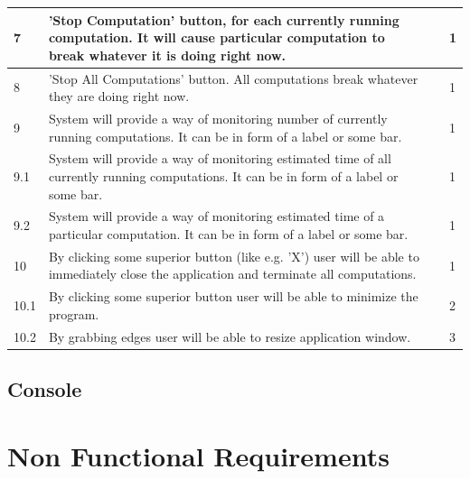 \documentclass{article}
\begin{document}
\begin{center}
\begin{longtable}{| l | p{4cm} | p{3.5cm} | l |}
		7 & 
		'Stop Computation' button, for each currently running computation. It will cause 				particular computation to break whatever it is doing right now. & 
		 &
		1
		\\ \hline	
		
		8 & 
		'Stop All Computations' button. All computations break whatever they are doing right 			now. & 
		 &
		1
		\\ \hline		
		
		9 & 
		System will provide a way of monitoring number of currently running computations. It 			can be in form of a label or some bar. & 
		 &
		1
		\\ \hline	

		9.1 & 
		System will provide a way of monitoring estimated time of all currently running 				computations. It can be in form of a label or some bar. & 
		 &
		1
		\\ \hline

		9.2 & 
		System will provide a way of monitoring estimated time of a particular computation. It 			can be in form of a label or some bar. & 
		 &
		1
		\\ \hline

		10 & 
		By clicking some superior button (like e.g. 'X') user will be able to immediately 				close the application and terminate all computations.  & 
		 &
		1
		\\ \hline
	
		10.1 & 
		By clicking some superior button user will be able to minimize the program. & 
		 &
		2
		\\ \hline	

		10.2 & 
		By grabbing edges user will be able to resize application window. & 
		 &
		3
		\\ \hline
		
	\end{longtable}
\end{center}	

\subsection{Console}


\newpage

\section{Non Functional Requirements}
\end{document}
